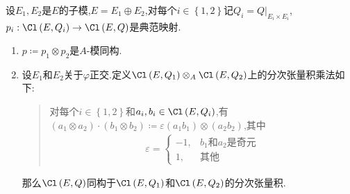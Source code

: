 \begin{corollary}{}{}
	设$E_{1},E_{2}$是$E$的子模,$E=E_{1}\oplus E_{2}$,对每个$i\in\left\{1,2\right\}$记$Q_{i}=Q|_{E_{i}\times E_{i}}$,$p_{i}:\Cl\left(E,Q_{i}\right)\to\Cl\left(E,Q\right)$是典范映射.
	\begin{enumerate}
		\item $p\coloneq p_{1}\otimes p_{2}$是$A$-模同构.
		\item 设$E_{1}$和$E_{2}$关于$\varphi$正交.定义$\Cl\left(E,Q_{1}\right)\otimes_{A}\Cl\left(E,Q_{2}\right)$上的分次张量积乘法如下:
		\begin{quote}
			对每个$i\in\left\{1,2\right\}$和$a_{i},b_{i}\in\Cl\left(E,Q_{i}\right)$,有$\left(a_{1}\otimes a_{2}\right)\cdot\left(b_{1}\otimes b_{2}\right)\coloneq\varepsilon\left(a_{1}b_{1}\right)\otimes\left(a_{2}b_{2}\right)$,其中
			\begin{align*}
				\varepsilon=
				\begin{cases}
					-1,&b_{1}\text{和}a_{2}\text{是奇元}\\
					1,&\text{其他}
				\end{cases}
			\end{align*}
		\end{quote}
		那么$\Cl\left(E,Q\right)$同构于$\Cl\left(E,Q_{1}\right)$和$\Cl\left(E,Q_{2}\right)$的分次张量积.
	\end{enumerate}
\end{corollary}















